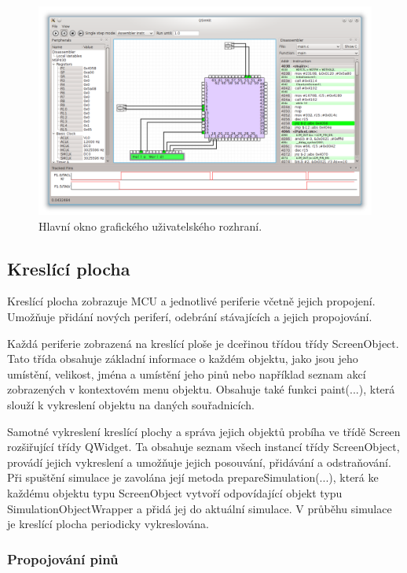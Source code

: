 \begin{figure}[ht]
\centering
\includegraphics[trim=0cm 0cm 0cm 0cm, scale=0.45]{fig/screen}
\caption{Hlavní okno grafického uživatelského rozhraní.}
\label{fig:screen}
\end{figure}

\subsection{Kreslící plocha}
\label{kreslici_plocha}

Kreslící plocha zobrazuje MCU a jednotlivé periferie včetně jejich propojení. Umožňuje přidání nových periferí, odebrání stávajících a jejich propojování.

Každá periferie zobrazená na kreslící ploše je dceřinou třídou třídy ScreenObject. Tato třída obsahuje základní informace o každém objektu, jako jsou jeho umístění, velikost, jména a umístění jeho pinů nebo například seznam akcí zobrazených v kontextovém menu objektu. Obsahuje také funkci paint(...), která slouží k vykreslení objektu na daných souřadnicích.

Samotné vykreslení kreslící plochy a správa jejich objektů probíha ve třídě Screen rozšiřující třídy QWidget. Ta obsahuje seznam všech instancí třídy ScreenObject, provádí jejich vykreslení a umožňuje jejich posouvání, přidávání a odstraňování. Při spuštění simulace je zavolána její metoda prepareSimulation(...), která ke každému objektu typu ScreenObject vytvoří odpovídající objekt typu SimulationObjectWrapper a přidá jej do aktuální simulace. V průběhu simulace je kreslící plocha periodicky vykreslována.

\subsubsection{Propojování pinů}

